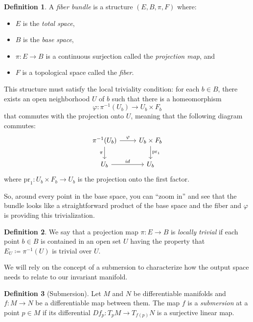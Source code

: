 \documentclass{article} %
\newcounter{ct}
\theoremstyle{definition}
\newtheorem{definition}{Definition}
\theoremstyle{remark}
\begin{document}
\begin{definition}
A \emph{fiber bundle} is a structure \((E, B, \pi, F)\) where:
\begin{itemize}
    \item \(E\) is the \emph{total space},
    \item \(B\) is the \emph{base space},
    \item \(\pi: E \to B\) is a continuous surjection called the \emph{projection map}, and
    \item \(F\) is a topological space called the \emph{fiber}.
\end{itemize}
This structure must satisfy the local triviality condition: for each \(b \in B\), there exists an open neighborhood \(U\) of \(b\) such that there is a homeomorphism
\[
\varphi: \pi^{-1}(U_{b}) \to U_{b} \times F_{b}
\]
that commutes with the projection onto \(U\), meaning that the following diagram commutes:
\begin{equation*}
    \begin{tikzcd}
        \pi^{-1}(U_{b}) \arrow[rightarrow]{r}{\varphi}	\arrow[swap]{d}{\pi} & U_{b} \times F_{b}	\arrow[rightarrow]{d}{\operatorname{pr}_{1}} 	\\
        U_{b} \arrow[rightarrow]{r}{id}  &	 	U_{b}
      \end{tikzcd}
\end{equation*}%
where \(\text{pr}_{1}: U_{b} \times F_{b} \to U_{b}\) is the projection onto the first factor.
\end{definition}

So, around every point in the base space, you can ``zoom in'' and see that the bundle looks like a straightforward product of the base space and the fiber and \(\varphi\) is providing this trivialization.

\begin{definition}
We say that a projection map \(\pi:E \rightarrow  B\) is \emph{locally trivial} if each point \(b \in B\) is contained in an open set \(U\) having the property that \(E_{U}\coloneqq \pi^{-1}(U)\) is trivial over \(U\).
\end{definition}

We will rely on the concept of a submersion to characterize how the output space needs to relate to our invariant manifold.
\begin{definition}[Submersion]
Let \(M\) and \(N\) be differentiable manifolds and \(f\colon M\to N\) be a differentiable map between them.
 The map \(f\) is a \emph{submersion} at a point \(p\in M\) if its differential \(Df_{p}\colon T_{p}M\to T_{f(p)}N\) is a surjective linear map.
\end{definition}
\end{document}
